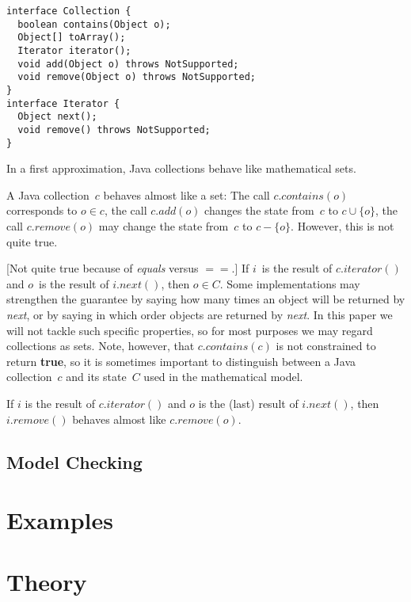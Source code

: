 \documentclass[a4paper]{article}
\theoremstyle{remark}
\begin{document}
\begin{lstlisting}
interface Collection {
  boolean contains(Object o);
  Object[] toArray();
  Iterator iterator();
  void add(Object o) throws NotSupported;
  void remove(Object o) throws NotSupported;
}
interface Iterator {
  Object next();
  void remove() throws NotSupported;
}
\end{lstlisting}

In a first approximation, Java collections behave like mathematical sets.

A Java collection~$c$ behaves almost like a set:
The call $c.\mathit{contains}(o)$ corresponds to $o\in c$, the call $c.\mathit{add}(o)$ changes the state from~$c$ to $c\cup\{o\}$, the call $c.\mathit{remove}(o)$ may change the state from~$c$ to $c-\{o\}$.
However, this is not quite true.




[Not quite true because of \textit{equals} versus $==$.]
If $i$~is the result of $c.\mathit{iterator}()$ and $o$~is the result of $i.\mathit{next}()$, then $o\in C$.
Some implementations may strengthen the guarantee by saying how many times an object will be returned by \textit{next}, or by saying in which order objects are returned by \textit{next}.
In this paper we will not tackle such specific properties, so for most purposes we may regard collections as sets.
Note, however, that $c.\mathit{contains}(c)$ is not constrained to return \textbf{true}, so it is sometimes important to distinguish between a Java collection~$c$ and its state~$C$ used in the mathematical model.

If $i$ is the result of $c.\mathit{iterator}()$ and $o$ is the (last) result of $i.\mathit{next}()$, then $i.\mathit{remove}()$ behaves almost like $c.\mathit{remove}(o)$.

\subsection{Model Checking}

\section{Examples}

\section{Theory}
\end{document}
